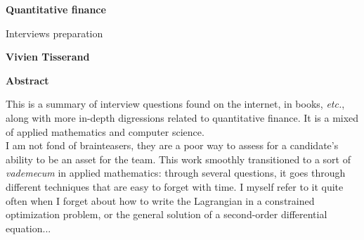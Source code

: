 \begin{titlepage}
   \begin{center}
       \vspace*{1cm}

        \Large
       \textbf{Quantitative finance}

        \large
       \vspace{0.5cm}
        Interviews preparation
            
       \vspace{1.5cm}

       \textbf{Vivien Tisserand}

       \vfill
            
       \vspace{0.8cm}
     

    \textbf{Abstract}
    \end{center}
    
    This is a summary of interview questions found on the internet, in books, \textit{etc.}, along with more in-depth digressions related to quantitative finance. It is a mixed of applied mathematics and computer science.\\
    I am not fond of brainteasers, they are a poor way to assess for a candidate's ability to be an asset for the team. This work smoothly transitioned to a sort of \textit{vademecum} in applied mathematics: through several questions, it goes through different techniques that are easy to forget with time. I myself refer to it quite often when I forget about how to write the Lagrangian in a constrained optimization problem, or the general solution of a second-order differential equation...
    
\end{titlepage}
